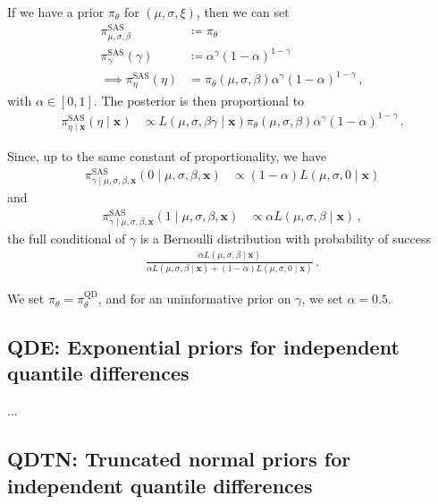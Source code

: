 \documentclass{article}
\begin{document}
%
If we have a prior $\pi_\theta$ for $(\mu, \sigma, \xi)$, then we can set
%
\begin{align*}
	\pi_{\mu, \sigma, \beta}^{\text{SAS}} &\coloneqq \pi_\theta \\
	\pi_\gamma^{\text{SAS}}(\gamma)
		&\coloneqq \alpha ^ \gamma (1 - \alpha) ^ {1 - \gamma} \\
	\implies \pi_{\eta}^{\text{SAS}}(\eta)
		&= \pi_\theta(\mu, \sigma, \beta)
		\alpha ^ \gamma (1 - \alpha) ^ {1 - \gamma} \,,
\end{align*}
%
with $\alpha \in [0, 1]$. The posterior is then proportional to
%
\begin{align*}
	\pi_{\eta \mid \mathbf{x}}^{\text{SAS}}(\eta \mid \mathbf{x}) &\propto
		L(\mu, \sigma, \beta \gamma \mid \mathbf{x})
		\pi_\theta(\mu, \sigma, \beta)
		\alpha ^ \gamma (1 - \alpha) ^ {1 - \gamma} \,.
\end{align*}
%

%
Since, up to the same constant of proportionality, we have
%
\begin{align*}
	\pi_{\gamma \mid \mu, \sigma, \beta, \mathbf{x}}^{\text{SAS}}
		(0 \mid \mu, \sigma, \beta, \mathbf{x}) &\propto
		(1 - \alpha) L(\mu, \sigma, 0 \mid \mathbf{x})
\end{align*}
and
\begin{align*}
	\pi_{\gamma \mid \mu, \sigma, \beta, \mathbf{x}}^{\text{SAS}}
		(1 \mid \mu, \sigma, \beta, \mathbf{x}) &\propto
		\alpha L(\mu, \sigma, \beta \mid \mathbf{x}) \,,
\end{align*}
%
the full conditional of $\gamma$ is a Bernoulli distribution
with probability of success
%
\begin{align*}
	\frac{\alpha L(\mu, \sigma, \beta \mid \mathbf{x})}
		{\alpha L(\mu, \sigma, \beta \mid \mathbf{x})
		+ (1 - \alpha) L(\mu, \sigma, 0 \mid \mathbf{x})} \,.
\end{align*}
%

%
We set $\pi_\theta = \pi_\theta^{\text{QD}}$,
and for an uninformative prior on $\gamma$, we set $\alpha = 0.5$.
%
\subsection{QDE:
	Exponential priors for independent quantile differences}
%

%
...
%
\subsection{QDTN:
	Truncated normal priors for independent quantile differences}
%
\end{document}

